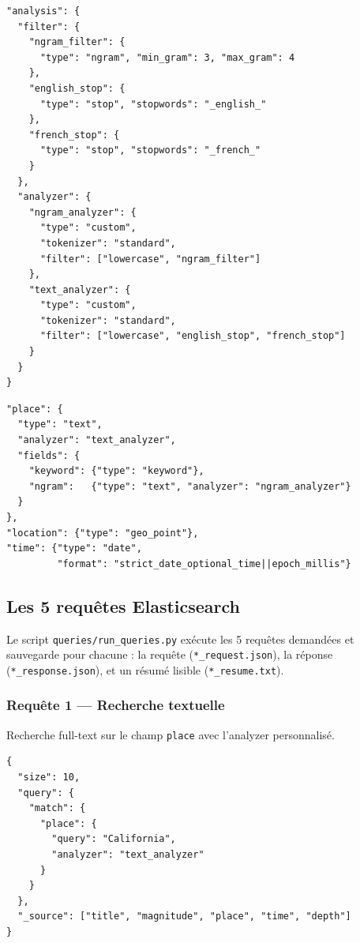 \documentclass[12pt,a4paper]{article}
\begin{document}
\begin{lstlisting}[style=json, caption={Mapping Elasticsearch — analyzers et filtres}]
"analysis": {
  "filter": {
    "ngram_filter": {
      "type": "ngram", "min_gram": 3, "max_gram": 4
    },
    "english_stop": {
      "type": "stop", "stopwords": "_english_"
    },
    "french_stop": {
      "type": "stop", "stopwords": "_french_"
    }
  },
  "analyzer": {
    "ngram_analyzer": {
      "type": "custom",
      "tokenizer": "standard",
      "filter": ["lowercase", "ngram_filter"]
    },
    "text_analyzer": {
      "type": "custom",
      "tokenizer": "standard",
      "filter": ["lowercase", "english_stop", "french_stop"]
    }
  }
}
\end{lstlisting}

\begin{lstlisting}[style=json, caption={Mapping — champ multi-field \texttt{place} et geo\_point}]
"place": {
  "type": "text",
  "analyzer": "text_analyzer",
  "fields": {
    "keyword": {"type": "keyword"},
    "ngram":   {"type": "text", "analyzer": "ngram_analyzer"}
  }
},
"location": {"type": "geo_point"},
"time": {"type": "date",
         "format": "strict_date_optional_time||epoch_millis"}
\end{lstlisting}

\subsection{Les 5 requêtes Elasticsearch}

Le script \texttt{queries/run\_queries.py} exécute les 5 requêtes demandées et sauvegarde pour chacune : la requête (\texttt{*\_request.json}), la réponse (\texttt{*\_response.json}), et un résumé lisible (\texttt{*\_resume.txt}).

\subsubsection{Requête 1 — Recherche textuelle}

Recherche full-text sur le champ \texttt{place} avec l'analyzer personnalisé.

\begin{lstlisting}[style=json, caption={Requête textuelle — séismes en Californie}]
{
  "size": 10,
  "query": {
    "match": {
      "place": {
        "query": "California",
        "analyzer": "text_analyzer"
      }
    }
  },
  "_source": ["title", "magnitude", "place", "time", "depth"]
}
\end{lstlisting}
\end{document}
